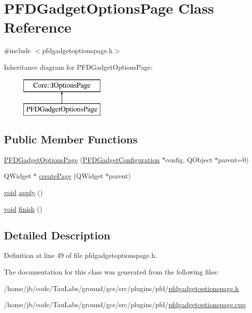 \hypertarget{class_p_f_d_gadget_options_page}{\section{\-P\-F\-D\-Gadget\-Options\-Page \-Class \-Reference}
\label{class_p_f_d_gadget_options_page}
}


{\ttfamily \#include $<$pfdgadgetoptionspage.\-h$>$}

\-Inheritance diagram for \-P\-F\-D\-Gadget\-Options\-Page\-:\begin{figure}[H]
\begin{center}
\leavevmode
\includegraphics[height=2.000000cm]{class_p_f_d_gadget_options_page}
\end{center}
\end{figure}
\subsection*{\-Public \-Member \-Functions}
\begin{DoxyCompactItemize}
\item 
\hyperlink{group___p_f_d_plugin_ga788662fb7f7fe425c74e222930c5234f}{\-P\-F\-D\-Gadget\-Options\-Page} (\hyperlink{class_p_f_d_gadget_configuration}{\-P\-F\-D\-Gadget\-Configuration} $\ast$config, \-Q\-Object $\ast$parent=0)
\item 
\-Q\-Widget $\ast$ \hyperlink{group___p_f_d_plugin_gafa8be3bab1132cd2079a9610e594aa77}{create\-Page} (\-Q\-Widget $\ast$parent)
\item 
\hyperlink{group___u_a_v_objects_plugin_ga444cf2ff3f0ecbe028adce838d373f5c}{void} \hyperlink{group___p_f_d_plugin_gafd1965bb221fe257dbf056b8441b15aa}{apply} ()
\item 
\hyperlink{group___u_a_v_objects_plugin_ga444cf2ff3f0ecbe028adce838d373f5c}{void} \hyperlink{group___p_f_d_plugin_ga1edd62ccbcef9e6090a5b9061c5af34f}{finish} ()
\end{DoxyCompactItemize}


\subsection{\-Detailed \-Description}


\-Definition at line 49 of file pfdgadgetoptionspage.\-h.



\-The documentation for this class was generated from the following files\-:\begin{DoxyCompactItemize}
\item 
/home/jb/code/\-Tau\-Labs/ground/gcs/src/plugins/pfd/\hyperlink{pfdgadgetoptionspage_8h}{pfdgadgetoptionspage.\-h}\item 
/home/jb/code/\-Tau\-Labs/ground/gcs/src/plugins/pfd/\hyperlink{pfdgadgetoptionspage_8cpp}{pfdgadgetoptionspage.\-cpp}\end{DoxyCompactItemize}
